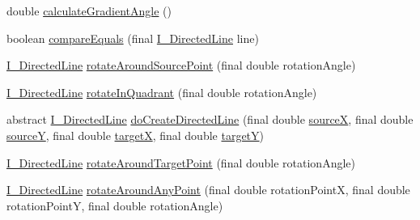 \begin{DoxyCompactItemize}
\item 
double \hyperlink{classorg_1_1tzi_1_1use_1_1gui_1_1views_1_1diagrams_1_1util_1_1_directed_line_a4c1ffaa5212c353cd89d77c92d3df308}{calculate\-Gradient\-Angle} ()
\item 
boolean \hyperlink{classorg_1_1tzi_1_1use_1_1gui_1_1views_1_1diagrams_1_1util_1_1_directed_line_a9403a8beeef98a480a4d1f283ce89b92}{compare\-Equals} (final \hyperlink{interfaceorg_1_1tzi_1_1use_1_1gui_1_1views_1_1diagrams_1_1util_1_1_i___directed_line}{I\-\_\-\-Directed\-Line} line)
\item 
\hyperlink{interfaceorg_1_1tzi_1_1use_1_1gui_1_1views_1_1diagrams_1_1util_1_1_i___directed_line}{I\-\_\-\-Directed\-Line} \hyperlink{classorg_1_1tzi_1_1use_1_1gui_1_1views_1_1diagrams_1_1util_1_1_directed_line_a689e87c94cd83adbfcfd42175ae3d47e}{rotate\-Around\-Source\-Point} (final double rotation\-Angle)
\item 
\hyperlink{interfaceorg_1_1tzi_1_1use_1_1gui_1_1views_1_1diagrams_1_1util_1_1_i___directed_line}{I\-\_\-\-Directed\-Line} \hyperlink{classorg_1_1tzi_1_1use_1_1gui_1_1views_1_1diagrams_1_1util_1_1_directed_line_a5a2c57fdf12742f1d91accc4183bd35e}{rotate\-In\-Quadrant} (final double rotation\-Angle)
\item 
abstract \hyperlink{interfaceorg_1_1tzi_1_1use_1_1gui_1_1views_1_1diagrams_1_1util_1_1_i___directed_line}{I\-\_\-\-Directed\-Line} \hyperlink{classorg_1_1tzi_1_1use_1_1gui_1_1views_1_1diagrams_1_1util_1_1_directed_line_a7d98440b0cba8d278ecc88779e4246a1}{do\-Create\-Directed\-Line} (final double \hyperlink{classorg_1_1tzi_1_1use_1_1gui_1_1views_1_1diagrams_1_1util_1_1_directed_line_a95565106a3a1ccfd0b6bd2646947e3d3}{source\-X}, final double \hyperlink{classorg_1_1tzi_1_1use_1_1gui_1_1views_1_1diagrams_1_1util_1_1_directed_line_a301e913cfddf79f92d6f8d4eb9676fdb}{source\-Y}, final double \hyperlink{classorg_1_1tzi_1_1use_1_1gui_1_1views_1_1diagrams_1_1util_1_1_directed_line_a656fcd747f02710cb526bb49f9ba3a19}{target\-X}, final double \hyperlink{classorg_1_1tzi_1_1use_1_1gui_1_1views_1_1diagrams_1_1util_1_1_directed_line_ac5e07022c9699c06c30232bd14d09caf}{target\-Y})
\item 
\hyperlink{interfaceorg_1_1tzi_1_1use_1_1gui_1_1views_1_1diagrams_1_1util_1_1_i___directed_line}{I\-\_\-\-Directed\-Line} \hyperlink{classorg_1_1tzi_1_1use_1_1gui_1_1views_1_1diagrams_1_1util_1_1_directed_line_a457a593d774c5b1e4def0afd9703bdca}{rotate\-Around\-Target\-Point} (final double rotation\-Angle)
\item 
\hyperlink{interfaceorg_1_1tzi_1_1use_1_1gui_1_1views_1_1diagrams_1_1util_1_1_i___directed_line}{I\-\_\-\-Directed\-Line} \hyperlink{classorg_1_1tzi_1_1use_1_1gui_1_1views_1_1diagrams_1_1util_1_1_directed_line_a7ae7a3dc5de930c13b41b42a38319e86}{rotate\-Around\-Any\-Point} (final double rotation\-Point\-X, final double rotation\-Point\-Y, final double rotation\-Angle)

\end{DoxyCompactItemize}
